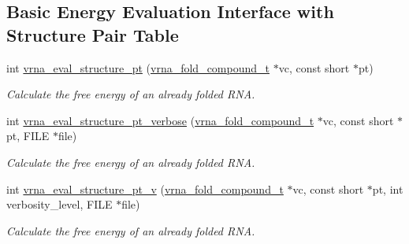 \subsection*{Basic Energy Evaluation Interface with Structure Pair Table}
\begin{DoxyCompactItemize}
\item 
int \hyperlink{group__eval_gadbd09372ddfd7a450bbd590c96a6bfe4}{vrna\+\_\+eval\+\_\+structure\+\_\+pt} (\hyperlink{group__fold__compound_ga1b0cef17fd40466cef5968eaeeff6166}{vrna\+\_\+fold\+\_\+compound\+\_\+t} $\ast$vc, const short $\ast$pt)
\begin{DoxyCompactList}\small\item\em Calculate the free energy of an already folded R\+NA. \end{DoxyCompactList}\item 
int \hyperlink{group__eval_ga8a517cfeeae8c376ae7b1e0c401d38b4}{vrna\+\_\+eval\+\_\+structure\+\_\+pt\+\_\+verbose} (\hyperlink{group__fold__compound_ga1b0cef17fd40466cef5968eaeeff6166}{vrna\+\_\+fold\+\_\+compound\+\_\+t} $\ast$vc, const short $\ast$pt, F\+I\+LE $\ast$file)
\begin{DoxyCompactList}\small\item\em Calculate the free energy of an already folded R\+NA. \end{DoxyCompactList}\item 
int \hyperlink{group__eval_ga2c6533ba0afe4c88d335d8f1e0e2a48e}{vrna\+\_\+eval\+\_\+structure\+\_\+pt\+\_\+v} (\hyperlink{group__fold__compound_ga1b0cef17fd40466cef5968eaeeff6166}{vrna\+\_\+fold\+\_\+compound\+\_\+t} $\ast$vc, const short $\ast$pt, int verbosity\+\_\+level, F\+I\+LE $\ast$file)
\begin{DoxyCompactList}\small\item\em Calculate the free energy of an already folded R\+NA. \end{DoxyCompactList}\end{DoxyCompactItemize}
